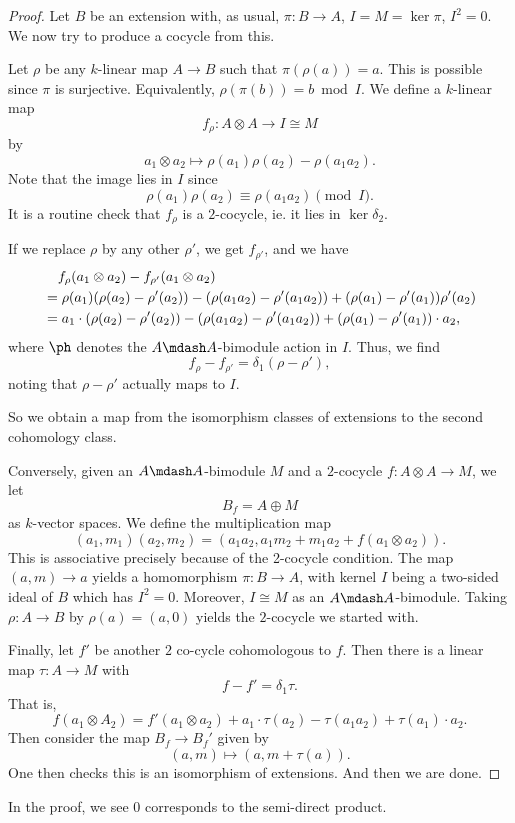 \documentclass[a4paper]{article}
\begin{document}
\begin{proof}
  Let $B$ be an extension with, as usual, $\pi: B \to A$, $I = M = \ker \pi$, $I^2 = 0$. We now try to produce a cocycle from this.

  Let $\rho$ be any $k$-linear map $A \to B$ such that $\pi(\rho(a)) = a$. This is possible since $\pi$ is surjective. Equivalently, $\rho(\pi(b)) = b \bmod I$. We define a $k$-linear map
  \[
    f_\rho: A \otimes A \to I \cong M
  \]
  by
  \[
    a_1 \otimes a_2 \mapsto \rho(a_1) \rho(a_2) - \rho(a_1 a_2).
  \]
  Note that the image lies in $I$ since
  \[
    \rho(a_1) \rho(a_2) \equiv \rho(a_1 a_2) \pmod I.
  \]
  It is a routine check that $f_\rho$ is a $2$-cocycle, ie. it lies in $\ker \delta_2$.

  If we replace $\rho$ by any other $\rho'$, we get $f_{\rho'}$, and we have
  \begin{align*}
    &\hphantom{={}}f_\rho(a_1 \otimes a_2) - f_{\rho'} (a_1 \otimes a_2) \\
    &= \rho(a_1) (\rho(a_2) - \rho'(a_2)) - (\rho(a_1 a_2) - \rho'(a_1 a_2)) + (\rho(a_1) - \rho'(a_1))\rho'(a_2)\\
    &= a_1 \cdot (\rho(a_2) - \rho'(a_2)) - (\rho(a_1 a_2) - \rho'(a_1 a_2)) + (\rho(a_1) - \rho'(a_1)) \cdot a_2,
  \end{align*}
  where $\ph$ denotes the $A\mdash A$-bimodule action in $I$. Thus, we find
  \[
    f_\rho - f_{\rho'} = \delta_1(\rho - \rho'),
  \]
  noting that $\rho - \rho'$ actually maps to $I$.

  So we obtain a map from the isomorphism classes of extensions to the second cohomology class.

  Conversely, given an $A\mdash A$-bimodule $M$ and a $2$-cocycle $f: A \otimes A \to M$, we let
  \[
    B_f = A \oplus M
  \]
  as $k$-vector spaces. We define the multiplication map
  \[
    (a_1, m_1)(a_2, m_2) = (a_1 a_2, a_1 m_2 + m_1 a_2 + f(a_1 \otimes a_2)).
  \]
  This is associative precisely because of the 2-cocycle condition. The map $(a, m) \to a$ yields a homomorphism $\pi: B \to A$, with kernel $I$ being a two-sided ideal of $B$ which has $I^2 = 0$. Moreover, $I \cong M$ as an $A\mdash A$-bimodule. Taking $\rho: A \to B$ by $\rho(a) = (a, 0)$ yields the $2$-cocycle we started with.

  Finally, let $f'$ be another $2$ co-cycle cohomologous to $f$. Then there is a linear map $\tau: A \to M$ with
  \[
    f - f' = \delta_1 \tau.
  \]
  That is,
  \[
    f(a_1 \otimes A_2) = f'(a_1 \otimes a_2) + a_1 \cdot \tau(a_2) - \tau(a_1 a_2) + \tau(a_1) \cdot a_2.
  \]
  Then consider the map $B_f \to B_f'$ given by
  \[
    (a, m) \mapsto (a, m + \tau(a)).
  \]
  One then checks this is an isomorphism of extensions. And then we are done.
\end{proof}
In the proof, we see $0$ corresponds to the semi-direct product.
\end{document}
